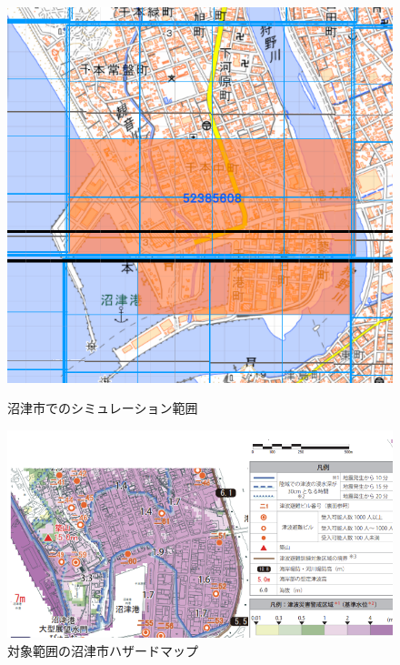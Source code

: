 \begin{figure}[H]
  \centering
  \begin{minipage}{0.45\textwidth}
      \centering
      \includegraphics[width=\textwidth]{Figures/NumazuRange.png} 
      \caption{沼津市でのシミュレーション範囲}
      \label{fig:NumazuMapRange}
  \end{minipage}
  \hfill %
  \begin{minipage}{0.45\textwidth}
      \centering
      \includegraphics[width=\textwidth]{Figures/NumazuHazerd.png} 
      \caption{対象範囲の沼津市ハザードマップ}
      \label{fig:right_image}
  \end{minipage}
\end{figure}

